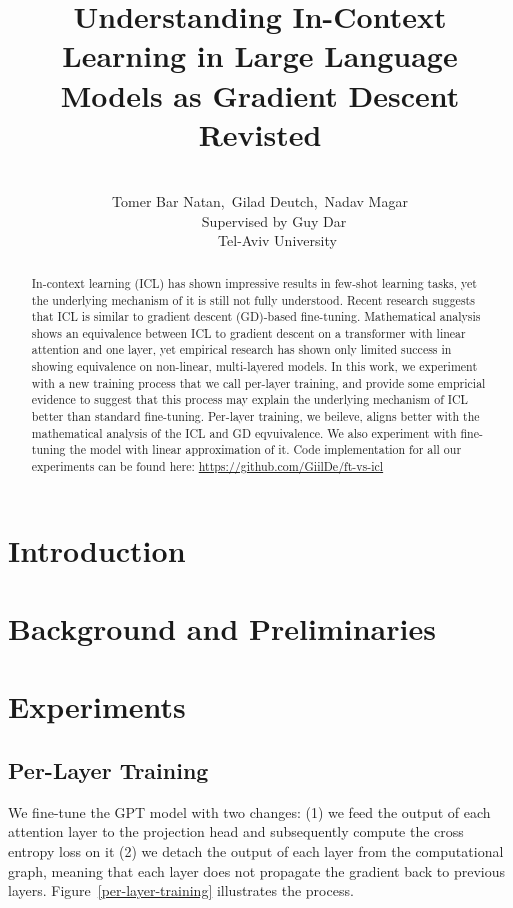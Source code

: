 \documentclass[11pt]{article}
\title{Understanding In-Context Learning in Large Language Models as Gradient Descent Revisted}
\author{\\
Tomer Bar Natan,~Gilad Deutch,~Nadav Magar\\
~~~~Supervised by Guy Dar\\
~~~~~Tel-Aviv University}
\date{}
\begin{document}
\maketitle

\begin{abstract}
	In-context learning (ICL) has shown impressive results in few-shot learning tasks, yet the underlying mechanism of it is still not fully understood.
	Recent research suggests that ICL is similar to gradient descent (GD)-based fine-tuning. 
	Mathematical analysis shows an equivalence between ICL to gradient descent on a transformer with linear attention and one layer,
	yet empirical research has shown only limited success in showing equivalence on non-linear, multi-layered models.
	In this work, we experiment with a new training process that we call per-layer training, 
	and provide some empricial evidence to suggest that this process may explain the underlying mechanism of ICL better than standard fine-tuning.
	Per-layer training, we beileve, aligns better with the mathematical analysis of the ICL and GD eqvuivalence.
	We also experiment with fine-tuning the model with linear approximation of it.
	Code implementation for all our experiments can be found here:
	\href{https://github.com/GiilDe/ft-vs-icl}{https://github.com/GiilDe/ft-vs-icl}
\end{abstract}

\section{Introduction}


\section{Background and Preliminaries}



\section{Experiments}
\subsection{Per-Layer Training}
We fine-tune the GPT model with two changes: (1) we feed the output of each attention layer to the projection head and subsequently compute the cross entropy loss on it
(2) we detach the output of each layer from the computational graph, meaning that each layer does not propagate the gradient back to previous layers. Figure~\ref{per-layer-training} illustrates the process.
\end{document}
